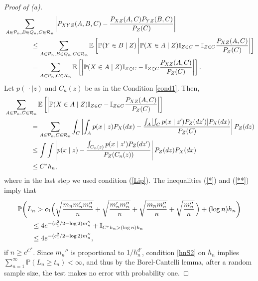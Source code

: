 \documentclass[11pt]{article}
\def\Q{Q}
\def\P{\mathcal{P}}
\def\PROB {{\mathbb P}}
\def\EXP {{\mathbb E}}
\def\IND{{\mathbb I}}
\begin{document}
\begin{proof}[Proof of (a)]
\begin{align*}
\MoveEqLeft[4]
\sum_{A\in \P_n,B\in \Q_n,C\in {\cal R}_n}
\left|P_{XYZ}(A,B,C)-\frac{P_{XZ}(A,C)P_{YZ}(B,C)}{P_{Z}(C)}\right|\nonumber\\
&\le
\sum_{A\in \P_n,B\in \Q_n,C\in {\cal R}_n}
\EXP\left[\PROB(Y\in B\mid Z)\left|\PROB(X\in A\mid Z) \IND_{Z\in C}
-\IND_{Z\in C}\frac{P_{XZ}(A,C)  }{P_{Z}(C)}\right|\right]\nonumber\\
&=
\sum_{A\in \P_n,C\in {\cal R}_n}
\EXP\left[\left|\PROB(X\in A\mid Z) \IND_{Z\in C}
-\IND_{Z\in C}\frac{P_{XZ}(A,C)  }{P_{Z}(C)}\right|\right].
\end{align*}
Let $p(\,\cdot\mid z)$ and $C_n(z)$ be as in the Condition \ref{cond1}.
Then,
\begin{align}
\MoveEqLeft[4]
\sum_{A\in \P_n,C\in {\cal R}_n}
\EXP\left[\left|\PROB(X\in A\mid Z) \IND_{Z\in C}
-\IND_{Z\in C}\frac{P_{XZ}(A,C)  }{P_{Z}(C)}\right|\right]\nonumber\\
&=
\sum_{A\in \P_n,C\in {\cal R}_n}
\int_C\left|\int_Ap(x\mid z)P_X(dx) 
-\frac{\int_A[\int_Cp(x\mid z')P_Z(dz') ]P_X(dx)   }{P_{Z}(C)}\right|P_Z(dz)\nonumber\\
&\le 
\int\int\left|p(x\mid z)
-\frac{\int_{C_n(z)}p(x\mid z')P_Z(dz')    }{P_{Z}(C_n(z))}\right|P_Z(dz)P_X(dx)\nonumber\\
&\le
C^*h_n,
\label{**}
\end{align}
where in the last step we used  condition (\ref{Lip}). 
The inequalities (\ref{*}) and (\ref{**})    imply that
\begin{align*}
\MoveEqLeft \PROB\bigg(L_n
>
c_1\Big(\sqrt{\frac{m_nm'_nm''_n}{n}} + \sqrt{\frac{m'_nm''_n}{n}}
+ \sqrt{\frac{m_nm''_n}{n}}+\sqrt{\frac{m''_n}{n}}\,\Big) +(\log n)h_n \bigg)\\
&\le
4e^{-(c_1^2/2-\log 2)m''_n}+\IND_{ C^* h_n  >(\log n) h_n}\\
&\le
4e^{-(c_1^2/2-\log 2)m''_n},
\end{align*}
if $n\ge e^{C^*}$. Since $m_n''$ is proportional to $1/h_n^{d'}$, condition \eqref{hnS2} on $h_n$ implies $\sum_{n=1}^{\infty} \PROB(L_n \ge t_n)  <\infty$,  and thus by the  Borel-Cantelli lemma,  after a random sample size, the test makes  no error with probability one.  
\end{proof} 
\end{document}
